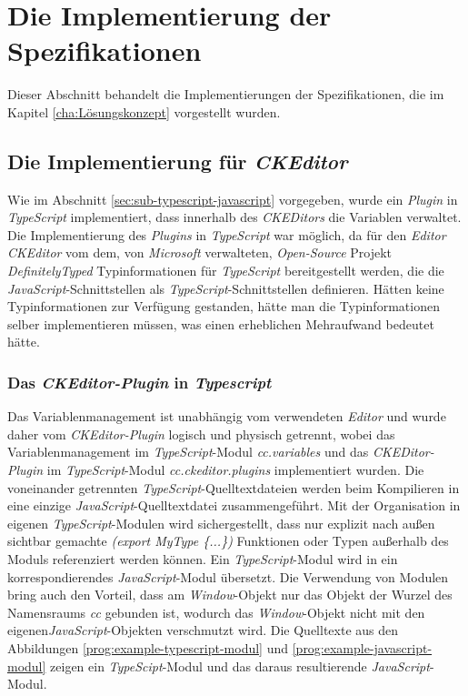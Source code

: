 \section{Die Implementierung der Spezifikationen}
Dieser Abschnitt behandelt die Implementierungen der Spezifikationen, die im Kapitel \ref{cha:Lösungskonzept} vorgestellt wurden. 

\subsection{Die Implementierung für \emph{CKEditor}}
Wie im Abschnitt \ref{sec:sub-typescript-javascript} vorgegeben, wurde ein \emph{Plugin} in \emph{TypeScript} implementiert, dass innerhalb des \emph{CKEDitors} die Variablen verwaltet. Die Implementierung des \emph{Plugins} in \emph{TypeScript} war möglich, da für den \emph{Editor CKEditor} vom dem, von \emph{Microsoft} verwalteten, \emph{Open-Source} Projekt \emph{DefinitelyTyped} Typinformationen für \emph{TypeScript} bereitgestellt werden, die die \emph{JavaScript}-Schnittstellen als \emph{TypeScript}-Schnittstellen definieren. Hätten keine Typinformationen zur Verfügung gestanden, hätte man die Typinformationen selber implementieren müssen, was einen erheblichen Mehraufwand bedeutet hätte.
 
\subsubsection{Das \emph{CKEditor-Plugin} in \emph{Typescript}}
Das Variablenmanagement ist unabhängig vom verwendeten \emph{Editor} und wurde daher vom \emph{CKEditor-Plugin} logisch und physisch getrennt, wobei das Variablenmanagement im \emph{TypeScript}-Modul \emph{cc.variables} und das \emph{CKEDitor-Plugin} im \emph{TypeScript}-Modul \emph{cc.ckeditor.plugins} implementiert wurden. Die voneinander getrennten \emph{TypeScript}-Quelltextdateien werden beim Kompilieren in eine einzige \emph{JavaScript}-Quelltextdatei zusammengeführt. Mit der Organisation in eigenen \emph{TypeScript}-Modulen wird sichergestellt, dass nur explizit nach außen sichtbar gemachte \emph{(export MyType \{...\})} Funktionen oder Typen außerhalb des Moduls referenziert werden können. Ein \emph{TypeScript}-Modul wird in ein korrespondierendes \emph{JavaScript}-Modul übersetzt. Die Verwendung von Modulen bring auch den Vorteil, dass am \emph{Window}-Objekt nur das Objekt der Wurzel des Namensraums \emph{cc} gebunden ist, wodurch das \emph{Window}-Objekt nicht mit den eigenen\emph{JavaScript}-Objekten verschmutzt wird. Die Quelltexte aus den Abbildungen \ref{prog:example-typescript-modul} und \ref{prog:example-javascript-modul} zeigen ein \emph{TypeScipt}-Modul und das daraus resultierende \emph{JavaScript}-Modul.
\newpage

